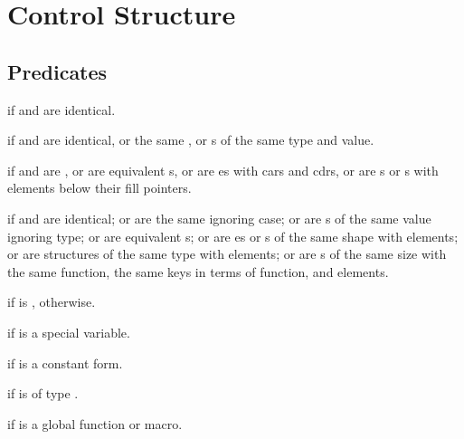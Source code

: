 %
%

\section{Control Structure}

\subsection{Predicates}
\begin{LIST}{1cm}

  {
  \retval{\T} if  and  are identical.
  }

  {
  \retval{\T} if  and 
  are identical, or the same , or s of the
  same type and value. 
  }

  {
  \retval{\T} if  and 
  are , or are equivalent s, or are es with
   cars and cdrs, or are s or s with
   elements below their fill pointers.
  }

  {
  \retval{\T} if  and  are identical; or are the
  same  ignoring case; or are s of the same
  value ignoring type; or are equivalent s; or are
  es or s of the same shape with 
  elements; or are structures of the same type with
   elements; or are s of the same size
  with the same  function, the same keys in terms of
   function, and  elements.
  }

  {
  \retval{\T} if  is \NIL, \retval{\NIL} otherwise.
  }

  {
    \retval{\T} if  is a special variable.
  }

  {
  \retval{\T} if  is a constant form.
  }

  {
  \retval{\T} if  is of type .
  }

  {
  \retval{\T} if  is a global function or macro.
  }


\end{LIST}


